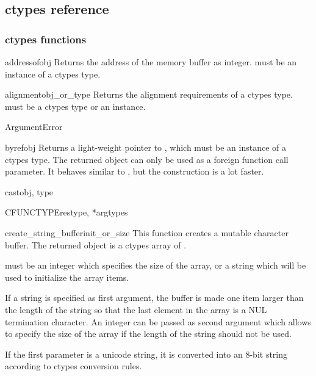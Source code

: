 \subsection{ctypes reference\label{ctypes-reference}}

\subsubsection{ctypes functions}

\begin{funcdesc}{addressof}{obj}
Returns the address of the memory buffer as integer.   must
be an instance of a ctypes type.
\end{funcdesc}

\begin{funcdesc}{alignment}{obj_or_type}
Returns the alignment requirements of a ctypes type.
 must be a ctypes type or an instance.
\end{funcdesc}

\begin{excclassdesc}{ArgumentError}{}
\end{excclassdesc}

\begin{funcdesc}{byref}{obj}
Returns a light-weight pointer to , which must be an instance
of a ctypes type.  The returned object can only be used as a foreign
function call parameter.  It behaves similar to ,
but the construction is a lot faster.
\end{funcdesc}

\begin{funcdesc}{cast}{obj, type}
\end{funcdesc}

\begin{funcdesc}{CFUNCTYPE}{restype, *argtypes}
\end{funcdesc}

\begin{funcdesc}{create_string_buffer}{init_or_size}
This function creates a mutable character buffer.  The returned object
is a ctypes array of .

 must be an integer which specifies the size of the
array, or a string which will be used to initialize the array items.

If a string is specified as first argument, the buffer is made one
item larger than the length of the string so that the last element in
the array is a NUL termination character.  An integer can be passed as
second argument which allows to specify the size of the array if the
length of the string should not be used.

If the first parameter is a unicode string, it is converted into an
8-bit string according to ctypes conversion rules.
\end{funcdesc}

